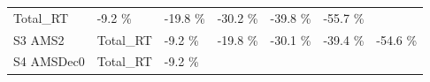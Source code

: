 \documentclass[]{article}
\begin{document}
\begin{longtable}[]{@{}lllllll@{}}
\begin{minipage}[t]{0.13\columnwidth}
Total\_RT\strut
\end{minipage} & \begin{minipage}[t]{0.11\columnwidth}\raggedright\strut
-9.2 \%\strut
\end{minipage} & \begin{minipage}[t]{0.11\columnwidth}\raggedright\strut
-19.8 \%\strut
\end{minipage} & \begin{minipage}[t]{0.11\columnwidth}\raggedright\strut
-30.2 \%\strut
\end{minipage} & \begin{minipage}[t]{0.11\columnwidth}\raggedright\strut
-39.8 \%\strut
\end{minipage} & \begin{minipage}[t]{0.11\columnwidth}\raggedright\strut
-55.7 \%\strut
\end{minipage}\tabularnewline
\begin{minipage}[t]{0.14\columnwidth}\raggedright\strut
S3 AMS2\strut
\end{minipage} & \begin{minipage}[t]{0.13\columnwidth}\raggedright\strut
Total\_RT\strut
\end{minipage} & \begin{minipage}[t]{0.11\columnwidth}\raggedright\strut
-9.2 \%\strut
\end{minipage} & \begin{minipage}[t]{0.11\columnwidth}\raggedright\strut
-19.8 \%\strut
\end{minipage} & \begin{minipage}[t]{0.11\columnwidth}\raggedright\strut
-30.1 \%\strut
\end{minipage} & \begin{minipage}[t]{0.11\columnwidth}\raggedright\strut
-39.4 \%\strut
\end{minipage} & \begin{minipage}[t]{0.11\columnwidth}\raggedright\strut
-54.6 \%\strut
\end{minipage}\tabularnewline
\begin{minipage}[t]{0.14\columnwidth}\raggedright\strut
S4 AMSDec0\strut
\end{minipage} & \begin{minipage}[t]{0.13\columnwidth}\raggedright\strut
Total\_RT\strut
\end{minipage} & \begin{minipage}[t]{0.11\columnwidth}\raggedright\strut
-9.2 \%\strut
\end{minipage} & \begin{minipage}[t]{0.11\columnwidth}\raggedright\strut

\end{minipage}
\end{longtable}
\end{document}
